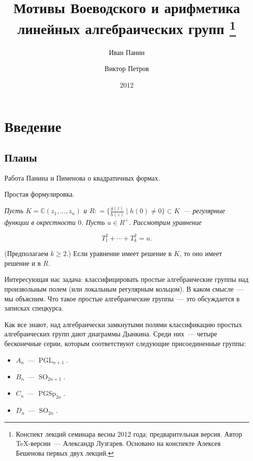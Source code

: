 \documentclass[a4paper]{article}
\DeclareMathOperator{\PGSp}{PGSp}
\DeclareMathOperator{\PGL}{PGL}
\DeclareMathOperator{\SO}{SO}
\newcommand{\dfn}{\mathrel{\mathop:}=}
\theoremstyle{definition}
\begin{document}
\author{Иван Панин\and Виктор Петров}
\title{Мотивы Воеводского и арифметика линейных алгебраических групп
\footnote{Конспект лекций семинара весны 2012 года; предварительная
версия. Автор \TeX-версии~--- Александр Лузгарев.
Основано на конспекте Алексея Бешенова первых двух лекций.}}
\date{2012}
\maketitle

\section{Введение}

\subsection{Планы}


Работа Панина и Пименова о квадратичных формах.

Простая формулировка. {\it Пусть $K = \mathbb{C} (z_1,\ldots,z_n)$ и
  $R \dfn \{ \frac{g(z)}{h(z)} \mid h(0) \ne 0 \} \subset K$~---
  регулярные функции в окрестности $0$. Пусть $u \in
  R^\times$. Рассмотрим уравнение

\[ T_1^2 + \cdots + T_k^2 = u. \]

\noindent (Предполагаем $k \ge 2$.) Если уравнение имеет решение в
$K$, то оно имеет решение и в $R$.}

\vspace{2em}

Интересующая нас задача: классифицировать простые алгебраические
группы над произвольным полем (или локальным регулярным кольцом). В
каком смысле~--- мы объясним. Что такое простые алгебраические
группы~--- это обсуждается в записках спецкурса. 

\vspace{2em}

Как все знают, над алгебраически замкнутыми полями классификацию
простых алгебраических групп дают диаграммы Дынкина. Среди них~---
четыре бесконечные серии, которым соответствуют следующие
присоединенные группы:

\begin{itemize}
\item $A_n$~--- $\PGL_{n+1}$.

\item $B_n$~--- $\SO_{2n+1}$.

\item $C_n$~--- $\PGSp_{2n}$.

\item $D_n$~--- $\SO_{2n}$.
\end{itemize}
\end{document}
